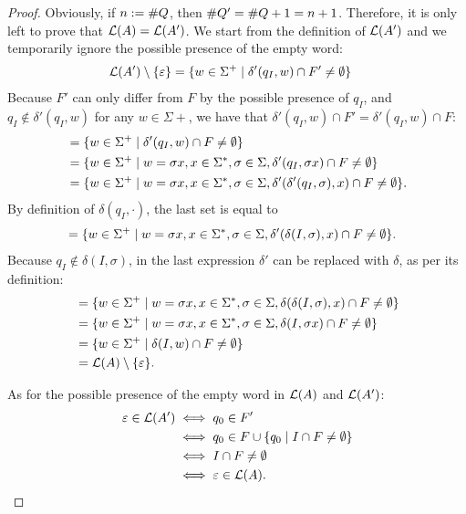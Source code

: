 \begin{proof}
	Obviously, if $n:=\# Q$, then $\# Q'=\# Q+1=n+1$. Therefore, it is only left to prove that $\mathcal L(A)=\mathcal L(A')$.
	We start from the definition of $\mathcal L(A')$ and we temporarily ignore the possible presence of the empty word:
	\begin{align*}
		\mathcal L(A')\setminus\{\varepsilon\} & = \{w\in\Sigma^+\mid \delta'(q_I,w)\cap F'\ne\emptyset\}
	\end{align*}
	Because $F'$ can only differ from $F$ by the possible presence of $q_I$, and $q_I\notin\delta'(q_I,w)$ for any $w\in\Sigma\plus$, we have that $\delta'(q_I,w)\cap F'=\delta'(q_I,w)\cap F$:
	\begin{align*}
		 & = \{w\in\Sigma^+\mid \delta'(q_I,w)\cap F\ne\emptyset\}                                                                    \\
		 & = \{w\in\Sigma^+\mid w=\sigma x, x\in\Sigma^*,\sigma\in\Sigma,\delta'(q_I,\sigma x)\cap F\ne\emptyset\}                 \\
		 & = \{w\in\Sigma^+\mid w=\sigma x, x\in\Sigma^*,\sigma\in\Sigma,\delta'(\delta'(q_I,\sigma),x)\cap F\ne\emptyset\} \text.
	\end{align*}
	By definition of $\delta(q_I,\cdot)$, the last set is equal to
	\begin{align*}
		 & = \{w\in\Sigma^+\mid w=\sigma x, x\in\Sigma^*,\sigma\in\Sigma,\delta'(\delta(I,\sigma),x)\cap F\ne\emptyset\} \text.
	\end{align*}
	Because $q_I\notin\delta(I,\sigma)$, in the last expression $\delta'$ can be replaced with $\delta$, as per its definition:
	\begin{align*}
		 & = \{w\in\Sigma^+\mid w=\sigma x, x\in\Sigma^*,\sigma\in\Sigma,\delta(\delta(I,\sigma),x)\cap F\ne\emptyset\} \\
		 & = \{w\in\Sigma^+\mid w=\sigma x, x\in\Sigma^*,\sigma\in\Sigma,\delta(I,\sigma x)\cap F\ne\emptyset\}         \\
		 & = \{w\in\Sigma^+\mid \delta(I,w)\cap F\ne\emptyset\}                                                            \\
		 & = \mathcal L(A)\setminus\{\varepsilon\} \text.
	\end{align*}

	As for the possible presence of the empty word in $\mathcal L(A)$ and $\mathcal L(A')$:
	\begin{align*}
		\varepsilon\in\mathcal L(A') & \iff q_0\in F'                                     \\
		                          & \iff q_0\in F\cup\{q_0\mid I\cap F\ne\emptyset\} \\
		                          & \iff I\cap F\ne\emptyset                           \\
		                          & \iff \varepsilon\in\mathcal L(A) \text. \qedhere
	\end{align*}
\end{proof}
